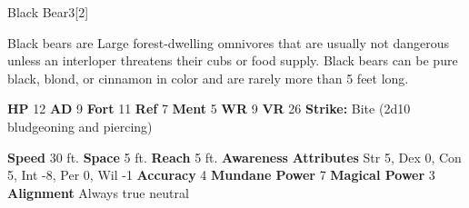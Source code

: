       
  \begin{monsubsection}{Black Bear}{3}[2]
    \vspace{-1em}\vspace{-1em}
    \vspace{0em}

    
            Black bears are Large forest-dwelling omnivores that are usually not dangerous unless an interloper threatens their cubs or food supply.
            Black bears can be pure black, blond, or cinnamon in color and are rarely more than 5 feet long.
          

    \begin{spellcontent}
      \begin{spelltargetinginfo}
        \pari \textbf{HP} 12 \monsep
          \textbf{AD} 9 \monsep
          \textbf{Fort} 11 \monsep
          \textbf{Ref} 7 \monsep
          \textbf{Ment} 5
        \pari \textbf{WR} 9 \monsep
        \textbf{VR} 26
        \pari \textbf{Strike:}
            Bite  (2d10 bludgeoning and piercing)
      \end{spelltargetinginfo}
    \end{spellcontent}
    \begin{monsterfooter}
      \pari \textbf{Speed} 30 ft. \monsep
        \textbf{Space} 5 ft. \monsep
        \textbf{Reach} 5 ft.
      \pari \textbf{Awareness} 
      \pari \textbf{Attributes}
        Str 5, Dex 0,
        Con 5, Int -8,
        Per 0, Wil -1
      \pari \textbf{Accuracy} 4 \monsep
        \textbf{Mundane Power} 7 \monsep
      \textbf{Magical Power} 3
      \pari \textbf{Alignment} Always true neutral
    \end{monsterfooter}
  \end{monsubsection}
  
  

